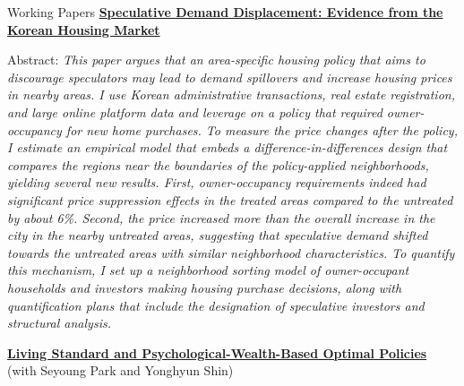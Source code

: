 \documentclass{resume} %
\begin{document}
		
		

	\begin{rSection}{Working Papers}
		\href{chanwoolkim.github.io}{\textbf{Speculative Demand Displacement: Evidence from the Korean Housing Market}}
		
		Abstract: \textit{This paper argues that an area-specific housing policy that aims to discourage speculators may lead to demand spillovers and increase housing prices in nearby areas. I use Korean administrative transactions, real estate registration, and large online platform data and leverage on a policy that required owner-occupancy for new home purchases. To measure the price changes after the policy, I estimate an empirical model that embeds a difference-in-differences design that compares the regions near the boundaries of the policy-applied neighborhoods, yielding several new results. First, owner-occupancy requirements indeed had significant price suppression effects in the treated areas compared to the untreated by about 6\%. Second, the price increased more than the overall increase in the city in the nearby untreated areas, suggesting that speculative demand shifted towards the untreated areas with similar neighborhood characteristics. To quantify this mechanism, I set up a neighborhood sorting model of owner-occupant households and investors making housing purchase decisions, along with quantification plans that include the designation of speculative investors and structural analysis.}
		
		\href{chanwoolkim.github.io}{\textbf{Living Standard and Psychological-Wealth-Based Optimal Policies}} \\ (with Seyoung Park and Yonghyun Shin)
		

\end{rSection}
\end{document}

